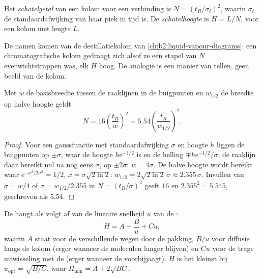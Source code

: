 \begin{definition}[Schotelgetal]\label{def:b2:chromatography:plates}
Het \emph{schotelgetal} van een kolom voor een verbinding is $N = (t_R/\sigma_t)^2$, waarin
$\sigma_t$ de standaardafwijking van haar piek in tijd is. De \emph{schotelhoogte} is
$H = L/N$, voor een kolom met lengte $L$.
\end{definition}

De namen komen van de destillatiekolom van \cref{ch:b2:liquid-vapour-diagrams}: een chromatografische
kolom gedraagt zich alsof ze een stapel van $N$ evenwichtstrappen was, elk $H$ hoog. De analogie is een manier van
tellen, geen beeld van de kolom.

\begin{proposition}\label{prop:b2:chromatography:plate-number}
Met $w$ de basisbreedte tussen de raaklijnen in de buigpunten en $w_{1/2}$ de breedte op
halve hoogte geldt
\begin{equation*}
N = 16\left(\frac{t_R}{w}\right)^2 = 5.54\left(\frac{t_R}{w_{1/2}}\right)^2.
\end{equation*}
\end{proposition}

\begin{proof}
Voor een gaussfunctie met standaardafwijking $\sigma$ en hoogte $h$ liggen de buigpunten op $\pm\sigma$,
waar de hoogte $h\mathrm e^{-1/2}$ is en de helling $\mp h\mathrm e^{-1/2}/\sigma$; de raaklijn daar
bereikt nul na nog eens $\sigma$, op $\pm2\sigma$: $w = 4\sigma$. De halve hoogte wordt bereikt waar
$\mathrm e^{-x^2/2\sigma^2} = 1/2$, $x = \sigma\sqrt{2\ln2}$: $w_{1/2} = 2\sqrt{2\ln2}\,\sigma \approx
2.355\,\sigma$. Invullen van $\sigma = w/4$ of $\sigma = w_{1/2}/2.355$ in $N = (t_R/\sigma)^2$ geeft
$16$ en $2.355^2 = 5.545$, geschreven als 5.54.
\end{proof}

\begin{proposition}\label{prop:b2:chromatography:van-deemter}
De  hangt als volgt af van de lineaire snelheid $u$ van de :
\begin{equation*}
H = A + \frac{B}{u} + Cu,
\end{equation*}
waarin $A$ staat voor de verschillende wegen door de pakking, $B/u$ voor diffusie langs de kolom
(erger wanneer de moleculen langer blijven) en $Cu$ voor de trage uitwisseling met de  (erger
wanneer de  voorbijjaagt). $H$ is het kleinst bij $u_{\mathrm{opt}} = \sqrt{B/C}$, waar $H_{\min} =
A + 2\sqrt{BC}$.
\end{proposition}

